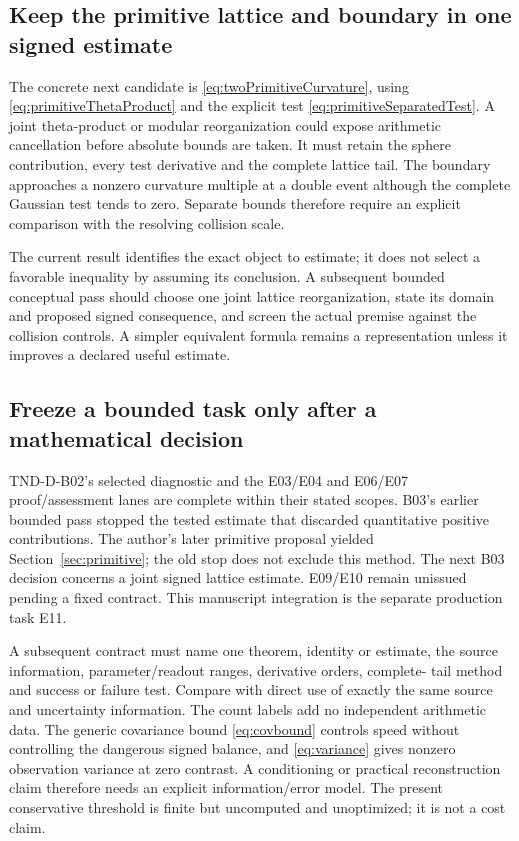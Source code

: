\subsection{Keep the primitive lattice and boundary in one signed estimate}
The concrete next candidate is \eqref{eq:twoPrimitiveCurvature}, using
\eqref{eq:primitiveThetaProduct} and the explicit test
\eqref{eq:primitiveSeparatedTest}. A joint theta-product or modular
reorganization could expose arithmetic cancellation before absolute
bounds are taken. It must retain the sphere contribution, every test
derivative and the complete lattice tail. The boundary approaches a
nonzero curvature multiple at a double event although the complete
Gaussian test tends to zero. Separate bounds therefore require an
explicit comparison with the resolving collision scale.

The current result identifies the exact object to estimate; it does not
select a favorable inequality by assuming its conclusion. A subsequent
bounded conceptual pass should choose one joint lattice reorganization,
state its domain and proposed signed consequence, and screen the actual
premise against the collision controls. A simpler equivalent formula
remains a representation unless it improves a declared useful estimate.

\subsection{Freeze a bounded task only after a mathematical decision}
TND-D-B02's selected diagnostic and the E03/E04 and E06/E07 proof/assessment
lanes are complete within their stated scopes. B03's earlier bounded pass
stopped the tested estimate that discarded quantitative positive
contributions. The author's later primitive proposal yielded
Section~\ref{sec:primitive}; the old stop does not exclude this method.
The next B03 decision concerns a joint signed lattice estimate. E09/E10
remain unissued pending a fixed contract. This manuscript integration is
the separate production task E11.

A subsequent contract must name one theorem, identity or estimate, the
source information, parameter/readout ranges, derivative orders, complete-
tail method and success or failure test. Compare with direct use of
exactly the same source and uncertainty information. The count labels add
no independent arithmetic data. The generic covariance bound
\eqref{eq:covbound} controls speed without controlling the dangerous signed
balance, and \eqref{eq:variance} gives nonzero observation variance at zero
contrast. A conditioning or practical reconstruction claim therefore
needs an explicit information/error model. The present conservative
threshold is finite but uncomputed and unoptimized; it is not a cost claim.

